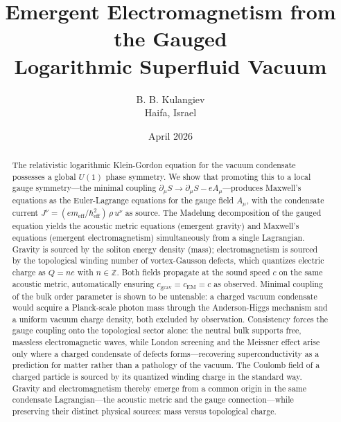 \documentclass[12pt, a4paper]{article}
\newcommand{\meff}{m_{\mathrm{eff}}}
\newcommand{\heff}{\hbar_{\mathrm{eff}}}
\begin{document}
\title{Emergent Electromagnetism from the Gauged\\
Logarithmic Superfluid Vacuum}

\author{B. B. Kulangiev\\\small{Haifa, Israel}}
\date{April 2026}
\maketitle

\begin{abstract}
\noindent
The relativistic logarithmic Klein-Gordon equation for the vacuum condensate possesses a global $U(1)$ phase symmetry. We show that promoting this to a local gauge symmetry---the minimal coupling $\partial_\mu S \to \partial_\mu S - eA_\mu$---produces Maxwell's equations as the Euler-Lagrange equations for the gauge field $A_\mu$, with the condensate current $J^\nu = (e\meff/\heff^2)\,\rho\,u^\nu$ as source. The Madelung decomposition of the gauged equation yields the acoustic metric equations (emergent gravity) and Maxwell's equations (emergent electromagnetism) simultaneously from a single Lagrangian. Gravity is sourced by the soliton energy density (mass); electromagnetism is sourced by the topological winding number of vortex-Gausson defects, which quantizes electric charge as $Q = ne$ with $n \in \mathbb{Z}$. Both fields propagate at the sound speed $c$ on the same acoustic metric, automatically ensuring $c_{\mathrm{grav}} = c_{\mathrm{EM}} = c$ as observed. Minimal coupling of the bulk order parameter is shown to be untenable: a charged vacuum condensate would acquire a Planck-scale photon mass through the Anderson-Higgs mechanism and a uniform vacuum charge density, both excluded by observation. Consistency forces the gauge coupling onto the topological sector alone: the neutral bulk supports free, massless electromagnetic waves, while London screening and the Meissner effect arise only where a charged condensate of defects forms---recovering superconductivity as a prediction for matter rather than a pathology of the vacuum. The Coulomb field of a charged particle is sourced by its quantized winding charge in the standard way. Gravity and electromagnetism thereby emerge from a common origin in the same condensate Lagrangian---the acoustic metric and the gauge connection---while preserving their distinct physical sources: mass versus topological charge.
\end{abstract}


\end{document}
